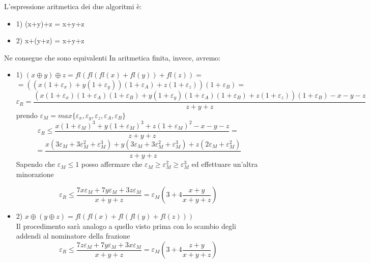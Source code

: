 L'espressione aritmetica dei due algoritmi è:\\
\begin{itemize}
\item{1)} (x+y)+z = x+y+z
\item{2)}  x+(y+z) = x+y+z
\end{itemize}
Ne consegue che sono equivalenti
In aritmetica finita, invece, avremo:
\begin{itemize}
\item{1)} \( (x\oplus y)\oplus z = fl(fl(fl(x) + fl(y)) +fl(z)) = \)\\
\( =((x(1+\varepsilon_x) + y(1+\varepsilon_y))(1+\varepsilon_A) +z(1+\varepsilon_z))(1+\varepsilon_B) = \) \\
\[\varepsilon_R =\frac{(x(1+\varepsilon_x)(1+\varepsilon_A)(1+\varepsilon_B) + y(1+\varepsilon_y)(1+\varepsilon_A)(1+\varepsilon_B)+z(1+\varepsilon_z))(1+\varepsilon_B) -x-y-z}{z+y+z}     \]
prendo \( \varepsilon_M = max\{\varepsilon_x, \varepsilon_y, \varepsilon_z, \varepsilon_A, \varepsilon_B\}\)
\[\varepsilon_R \leq \frac{x(1+\varepsilon_M)^3 + y(1+\varepsilon_M)^3+z(1+\varepsilon_M)^2 -x-y-z}{z+y+z} = \]
\[ =  \frac{x(3\varepsilon_M + 3\varepsilon_M^2 +\varepsilon_M^3) + y(3\varepsilon_M + 3\varepsilon_M^2 +\varepsilon_M^3)+z(2\varepsilon_M + \varepsilon_M^2)}{z+y+z}    \]
Sapendo che \(\varepsilon_M \leq 1 \) posso affermare che \( \varepsilon_M \geq \varepsilon_M^2 \geq \varepsilon_M^3 \) ed effettuare un'altra minorazione

\[ \varepsilon_R \leq \frac{7x\varepsilon_M + 7y\varepsilon_M + 3z\varepsilon_M}{x+y+z} = \varepsilon_M(3+4\frac{x+y}{x+y+z}) \]

\item{2)}  \( x\oplus (y\oplus z) =fl(fl(x) +fl( fl(y) +fl(z)))     \) \\
Il procedimento sarà analogo a quello visto prima con lo scambio degli addendi al nominatore della frazione
\[ \varepsilon_R \leq \frac{7z\varepsilon_M + 7y\varepsilon_M + 3x\varepsilon_M}{x+y+z} = \varepsilon_M(3+4\frac{z+y}{x+y+z}) \]
\end{itemize}
